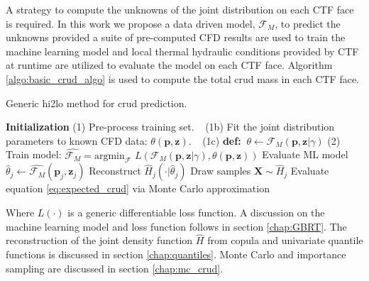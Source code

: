 A strategy to compute the unknowns of the joint distribution on each CTF face is required.  In this work we propose a data driven model, $\mathcal F_M$, to predict the unknowns provided a suite of pre-computed CFD results are used to train the machine learning model and local thermal hydraulic conditions provided by CTF at runtime are utilized to evaluate the model on each CTF face. Algorithm \ref{algo:basic_crud_algo} is used to compute the total crud mass in each CTF face.

\begin{algorithm}[H]
    \caption{Generic hi2lo method for crud prediction.}
    \begin{algorithmic}      
    \STATE \textbf{Initialization}  
    \STATE (1) Pre-process training set.  
    \STATE $\ \ $   (1b) Fit the joint distribution parameters to known CFD data: $\theta(\mathbf p, \mathbf z)$.  
    \STATE $\ \ $   (1c) \textbf{def:}  $\ \theta \leftarrow \mathcal F_M(\mathbf p, \mathbf z | \gamma)$
    \STATE (2) Train model:  $\hat{\mathcal F_M} =  \mathrm{argmin}_{\mathcal F}$
      $L(\mathcal{F}_M (\mathbf p, \mathbf z| \gamma), \theta(\mathbf p, \mathbf z)) $
    \STATE Evaluate ML model $\hat \theta_j \leftarrow \hat{\mathcal F_M}(\mathbf p_j, \mathbf z_j)$ \;
    \STATE Reconstruct $\hat H_j(\cdot |\hat \theta_j)$ \;
    \STATE Draw samples $\mathbf X \sim \hat H_j$ \;
    \STATE Evaluate equation \ref{eq:expected_crud} via Monte Carlo approximation \;
\ENDFOR
    \end{algorithmic}
\label{algo:basic_crud_algo}
\end{algorithm}
Where $L(\cdot)$ is a generic differentiable loss function.  A discussion on the machine learning model and loss function follows in section \ref{chap:GBRT}.  The reconstruction of the joint density function $\hat H$ from copula and univariate quantile functions is discussed in section \ref{chap:quantiles}.  Monte Carlo and importance sampling are discussed in section \ref{chap:mc_crud}.   


